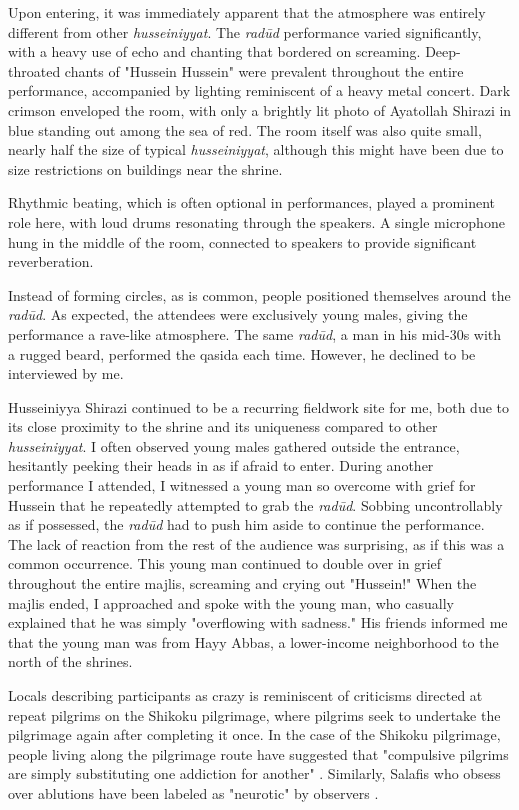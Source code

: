 Upon entering, it was immediately apparent that the atmosphere was entirely different from other \emph{husseiniyyat}. The \emph{radūd} performance varied significantly, with a heavy use of echo and chanting that bordered on screaming. Deep-throated chants of "Hussein Hussein" were prevalent throughout the entire performance, accompanied by lighting reminiscent of a heavy metal concert. Dark crimson enveloped the room, with only a brightly lit photo of Ayatollah Shirazi in blue standing out among the sea of red. The room itself was also quite small, nearly half the size of typical \emph{husseiniyyat}, although this might have been due to size restrictions on buildings near the shrine.

Rhythmic beating, which is often optional in performances, played a prominent role here, with loud drums resonating through the speakers. A single microphone hung in the middle of the room, connected to speakers to provide significant reverberation.

Instead of forming circles, as is common, people positioned themselves around the \emph{radūd}. As expected, the attendees were exclusively young males, giving the performance a rave-like atmosphere. The same \emph{radūd}, a man in his mid-30s with a rugged beard, performed the qasida each time. However, he declined to be interviewed by me.

Husseiniyya Shirazi continued to be a recurring fieldwork site for me, both due to its close proximity to the shrine and its uniqueness compared to other \emph{husseiniyyat}. I often observed young males gathered outside the entrance, hesitantly peeking their heads in as if afraid to enter. During another performance I attended, I witnessed a young man so overcome with grief for Hussein that he repeatedly attempted to grab the \emph{radūd}. Sobbing uncontrollably as if possessed, the \emph{radūd} had to push him aside to continue the performance. The lack of reaction from the rest of the audience was surprising, as if this was a common occurrence. This young man continued to double over in grief throughout the entire majlis, screaming and crying out "Hussein!" When the majlis ended, I approached and spoke with the young man, who casually explained that he was simply "overflowing with sadness." His friends informed me that the young man was from Hayy Abbas, a lower-income neighborhood to the north of the shrines.

Locals describing participants as crazy is reminiscent of criticisms directed at repeat pilgrims on the Shikoku pilgrimage, where pilgrims seek to undertake the pilgrimage again after completing it once. In the case of the Shikoku pilgrimage, people living along the pilgrimage route have suggested that "compulsive pilgrims are simply substituting one addiction for another" \cite{reader_pilgrims_2021}. Similarly, Salafis who obsess over ablutions have been labeled as "neurotic" by observers \cite[67]{gauvain_salafi_2013}.

